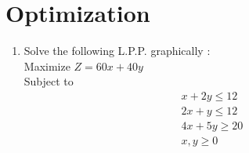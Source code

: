 \documentclass{article}
\begin{document}
\section {Optimization}
\begin {enumerate}
\item Solve the following L.P.P. graphically :\\Maximize $Z=60x+40y$\\Subject to
        \begin {align*}
            x+2y\leq12 \\
            2x+y\leq12 \\
            4x+5y\geq20\\
            x,y\geq0
            \end {align*}
\end {enumerate}
\end{document}
